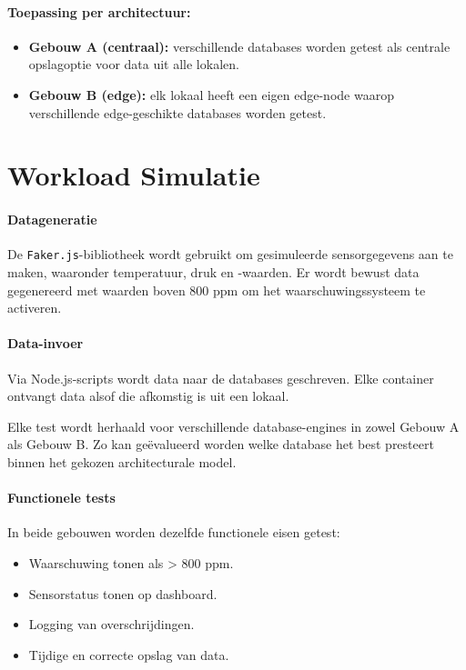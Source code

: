 \paragraph{Toepassing per architectuur:}
\begin{itemize}
    \item \textbf{Gebouw A (centraal):} verschillende databases worden getest als centrale opslagoptie voor data uit alle lokalen.

    \item \textbf{Gebouw B (edge):} elk lokaal heeft een eigen edge-node waarop verschillende edge-geschikte databases worden getest.
\end{itemize}

\section{Workload Simulatie}

\paragraph{Datageneratie}
De \texttt{Faker.js}-bibliotheek wordt gebruikt om gesimuleerde sensorgegevens aan te maken, waaronder temperatuur, druk en -waarden. Er wordt bewust data gegenereerd met waarden boven 800 ppm om het waarschuwingssysteem te activeren.

\paragraph{Data-invoer}
Via Node.js-scripts wordt data naar de databases geschreven. Elke container ontvangt data alsof die afkomstig is uit een lokaal.

Elke test wordt herhaald voor verschillende database-engines in zowel Gebouw A als Gebouw B. Zo kan geëvalueerd worden welke database het best presteert binnen het gekozen architecturale model.

\paragraph{Functionele tests}
In beide gebouwen worden dezelfde functionele eisen getest:
\begin{itemize}
    \item Waarschuwing tonen als  > 800 ppm.
    \item Sensorstatus tonen op dashboard.
    \item Logging van overschrijdingen.
    \item Tijdige en correcte opslag van data.
\end{itemize}

